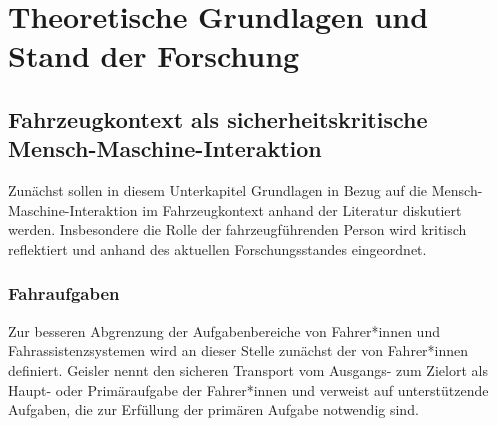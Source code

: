 
\chapter{Theoretische Grundlagen und Stand der Forschung}
\label{chapter:theory}


\section{Fahrzeugkontext als sicherheitskritische
Mensch-Maschine-Interaktion}
\label{sec:fas_sicherheitskritisch}
Zunächst sollen in diesem Unterkapitel Grundlagen in Bezug auf die Mensch-Maschine-Interaktion im Fahrzeugkontext anhand der Literatur \cite{Geisler_hci2021} diskutiert werden. Insbesondere die Rolle der fahrzeugführenden Person wird kritisch reflektiert und anhand des aktuellen Forschungsstandes eingeordnet. 

\subsection{Fahraufgaben}
\label{subsec:fahraufgabe}
Zur besseren Abgrenzung der Aufgabenbereiche von Fahrer*innen und Fahrassistenzsystemen wird an dieser Stelle zunächst der von Fahrer*innen definiert. Geisler \cite{Geisler_hci2021} nennt den sicheren Transport vom Ausgangs- zum Zielort als Haupt- oder Primäraufgabe der Fahrer*innen und verweist auf unterstützende Aufgaben, die zur Erfüllung der primären Aufgabe notwendig sind.

